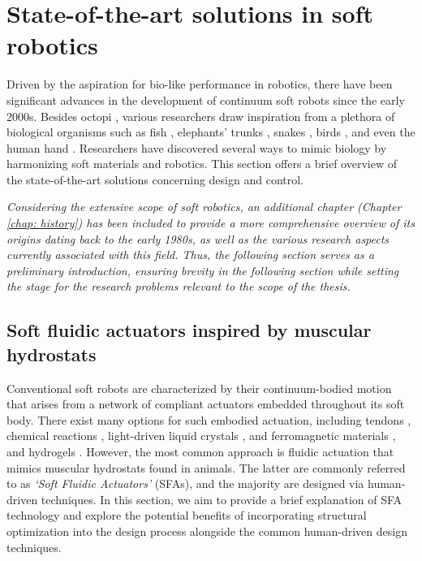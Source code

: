 \vspace{-3mm}
\section{State-of-the-art solutions in soft robotics}
Driven by the aspiration for bio-like performance in robotics, there have been significant advances in the development of continuum soft robots since the early 2000s. Besides octopi \cite{Renda2018,Chang2022,Mazzolai2019Oct}, various researchers draw inspiration from a plethora of biological organisms such as fish \cite{Katzschmann2018,Marchese2015}, elephants' trunks \cite{Jones2006,Wehner2016,Godage2015}, snakes \cite{Rafsanjani2018Feb,Gazzola2018,Marchese2015}, birds \cite{Gazzola2018,Zufferey2022Dec}, and even the human hand \cite{vanLaake2022Sep,Fras2018Oct}. Researchers have discovered several ways to mimic biology by harmonizing soft materials and robotics. This section offers a brief overview of the state-of-the-art solutions concerning design and control.

\begin{rmk}
\textit{Considering the extensive scope of soft robotics, an additional chapter (Chapter \ref{chap: history}) has been included to provide a more comprehensive overview of its origins dating back to the early 1980s, as well as the various research aspects currently associated with this field. Thus, the following section serves as a preliminary introduction, ensuring brevity in the following section while setting the stage for the research problems relevant to the scope of the thesis.}
\end{rmk}

\subsection{Soft fluidic actuators inspired by muscular hydrostats}
Conventional soft robots are characterized by their continuum-bodied motion that arises from a network of compliant actuators embedded throughout its soft body. There exist many options for such embodied actuation, including tendons \cite{Rucker2011Jul,Renda2017Aug}, chemical reactions \cite{Bartlett2015,Hubbard2021}, light-driven liquid crystals \cite{Vantomme2021,Pilz2020,daCunha2020}, and ferromagnetic materials \cite{Kim2019AugMagnet,Venkiteswaran2019Feb}, and hydrogels \cite{Jiao2022Jun,Lee2020Dec}. However, the most common approach is fluidic actuation \cite{Katzschmann2018,Marchese2015,Overvelde2015Sep,vanLaake2022Sep,Falkenhahn2015,DellaSantina2020a} that mimics muscular hydrostats found in animals. The latter are commonly referred to as \emph{`Soft Fluidic Actuators'} (SFAs), and the majority are designed via human-driven techniques. In this section, we aim to provide a brief explanation of SFA technology and explore the potential benefits of incorporating structural optimization into the design process alongside the common human-driven design techniques.


